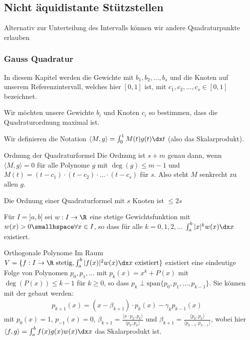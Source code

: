 \newsection
\subsection{Nicht äquidistante Stützstellen}
Alternativ zur Unterteilung des Intervalls können wir andere Quadraturpunkte erlauben

\subsubsection{Gauss Quadratur}
In diesem Kapitel werden die Gewichte mit $b_1, b_2, \ldots, b_s$ und die Knoten auf unserem Referenzintervall,
welches hier $[0, 1]$ ist, mit $c_1, c_2, \ldots, c_s \in [0, 1]$ bezeichnet.

Wir möchten unsere Gewichte $b_i$ und Knoten $c_i$ so bestimmen, dass die Quadraturordnung maximal ist.

Wir definieren die Notation $\langle M, g \rangle = \int_{0}^{1} M(t) g(t) \dx t$ (also das Skalarprodukt).

\begin{theorem}[]{Ordnung der Quadraturformel}
    Die Ordnung ist $s + m$ genau dann, wenn $\langle M, g \rangle = 0$ für alle Polynome $g$ mit $\deg(g) \leq m - 1$ und
    $M(t) = (t - c_1) \cdot (t - c_2) \cdot \ldots \cdot (t - c_s)$ für $s$. Also steht $M$ senkrecht zu allen $g$.
\end{theorem}

 Die Ordnung einer Quadraturformel mit $s$ Knoten ist $\leq 2s$



Für $I = ]a, b[$ sei $w: I \rightarrow \R$ eine stetige Gewichtsfunktion mit $w(x) > 0 \smallhspace \forall x \in I$, so dass für alle $k = 0, 1, 2, \ldots$
$\int_{a}^{b} |x|^k w(x) \dx x$ existiert.

\begin{theorem}[]{Orthogonale Polynome}
    Im Raum $V = \{ f: I \rightarrow \R \text{ stetig}, \int_{a}^{b} |f(x)|^2 w(x) \dx x \text{ existiert} \}$ existiert eine eindeutige Folge von Polynomen
    $p_0, p_1, \ldots$ mit $p_k(x) = x^k + P(x)$ mit $\deg(P(x)) \leq k - 1$ für $k \geq 0$, so dass $p_k \perp \text{span}\{ p_0, p_1, \ldots, p_{k - 1} \}$. Sie können mit der
     gebaut werden:
    \begin{align*}
        p_{k + 1}(x) = (x - \beta_{k + 1}) \cdot p_k(x) - \gamma_k p_{k - 1}(x)
    \end{align*}
    mit $p_0(x) = 1$, $p_{- 1}(x) = 0$, $\beta_{k + 1} = \frac{\langle x \cdot p_k, p_k \rangle}{\langle p_k, p_k \rangle}$
    und $\beta_{k + 1} = \frac{\langle p_k, p_k \rangle}{\langle p_{k - 1}, p_{k - 1} \rangle}$,
    wobei hier $\langle f, g \rangle = \int_{a}^{b} f(x) g(x) w(x) \dx x$
    das Skalarprodukt ist.
\end{theorem}

